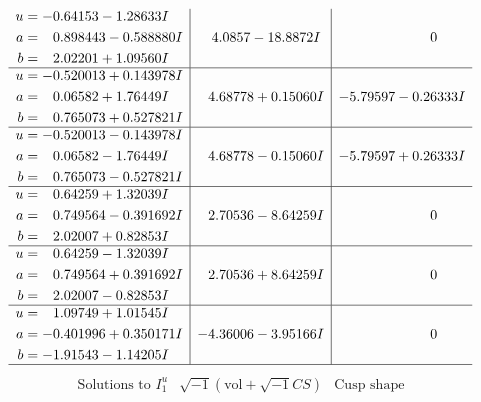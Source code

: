 \documentclass[1p]{elsarticle_modified}
\theoremstyle{definition}
\newcommand{\I}{\sqrt{-1}}
\begin{document}
$$\begin{array}{c|c|c}
\begin{aligned}
u &= -0.64153 - 1.28633 I \\
a &= \phantom{-}0.898443 - 0.588880 I \\
b &= \phantom{-}2.02201 + 1.09560 I\end{aligned}
 & \phantom{-}4.0857 - 18.8872 I & \phantom{-0.000000 } 0 \\ \hline\begin{aligned}
u &= -0.520013 + 0.143978 I \\
a &= \phantom{-}0.06582 + 1.76449 I \\
b &= \phantom{-}0.765073 + 0.527821 I\end{aligned}
 & \phantom{-}4.68778 + 0.15060 I & -5.79597 - 0.26333 I \\ \hline\begin{aligned}
u &= -0.520013 - 0.143978 I \\
a &= \phantom{-}0.06582 - 1.76449 I \\
b &= \phantom{-}0.765073 - 0.527821 I\end{aligned}
 & \phantom{-}4.68778 - 0.15060 I & -5.79597 + 0.26333 I \\ \hline\begin{aligned}
u &= \phantom{-}0.64259 + 1.32039 I \\
a &= \phantom{-}0.749564 - 0.391692 I \\
b &= \phantom{-}2.02007 + 0.82853 I\end{aligned}
 & \phantom{-}2.70536 - 8.64259 I & \phantom{-0.000000 } 0 \\ \hline\begin{aligned}
u &= \phantom{-}0.64259 - 1.32039 I \\
a &= \phantom{-}0.749564 + 0.391692 I \\
b &= \phantom{-}2.02007 - 0.82853 I\end{aligned}
 & \phantom{-}2.70536 + 8.64259 I & \phantom{-0.000000 } 0 \\ \hline\begin{aligned}
u &= \phantom{-}1.09749 + 1.01545 I \\
a &= -0.401996 + 0.350171 I \\
b &= -1.91543 - 1.14205 I\end{aligned}
 & -4.36006 - 3.95166 I & \phantom{-0.000000 } 0\\
 \hline 
 \end{array}$$\newpage$$\begin{array}{c|c|c}  
\text{Solutions to }I^u_{1}& \I (\text{vol} + \sqrt{-1}CS) & \text{Cusp shape}\\

\end{array}$$
\end{document}
